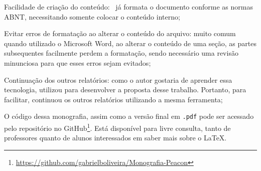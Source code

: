 \begin{alineas}
	\item Facilidade de criação do conteúdo: \abnTeX\ já formata o documento conforme as normas ABNT, necessitando somente colocar o conteúdo interno;
	\item Evitar erros de formatação ao alterar o conteúdo do arquivo: muito comum quando utilizado o Microsoft Word, ao alterar o conteúdo de uma seção, as partes subsequentes facilmente perdem a formatação, sendo necessário uma revisão minunciosa para que esses erros sejam evitados;
	\item Continuação dos outros relatórios: como o autor gostaria de aprender essa tecnologia, utilizou para desenvolver a proposta desse trabalho. Portanto, para facilitar, continuou os outros relatórios utilizando a mesma ferramenta;
\end{alineas}

O código dessa monografia, assim como a versão final em \texttt{.pdf} pode ser acessado pelo repositório no GitHub\footnote{\url{https://github.com/gabrielboliveira/Monografia-Peacon}}. Está disponível para livre consulta, tanto de professores quanto de alunos interessados em saber mais sobre o \LaTeX.